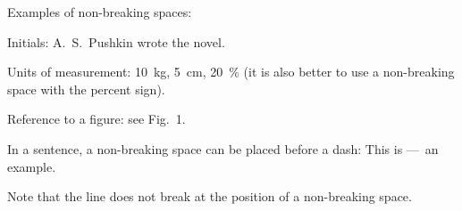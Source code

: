 \documentclass[a4paper,12pt]{article}
\begin{document}
Examples of non-breaking spaces:

Initials: A.~S.~Pushkin wrote the novel.

Units of measurement: 10~kg, 5~cm, 20~\% (it is also better to use a non-breaking space with the percent sign).

Reference to a figure: see Fig.~1.

In a sentence, a non-breaking space can be placed before a dash: This is ---~an example.

Note that the line does not break at the position of a non-breaking space.
\end{document}
